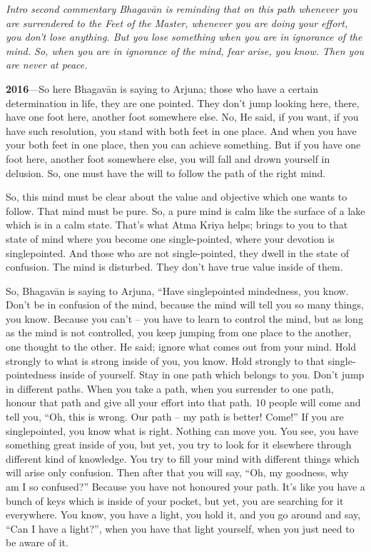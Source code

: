 \textit{Intro second commentary
Bhagavān is reminding that on this path whenever you are surrendered to the Feet of the Master, whenever you are doing your effort, you don’t lose anything. But you lose something when you are in ignorance of the mind. So, when you are in ignorance of the mind, fear arise, you know. Then you are never at peace.}

\textbf{2016}---So here Bhagavān is saying to Arjuna; those who have a certain determination in life, they are one pointed. They don’t jump looking here, there, have one foot here, another foot somewhere else. No, He said, if you want, if you have such resolution, you stand with both feet in one place. And when you have your both feet in one place, then you can achieve something. But if you have one foot here, another foot somewhere else, you will fall and drown yourself in delusion. So, one must have the will to follow the path of the right mind.

So, this mind must be clear about the value and objective which one wants to follow. That mind must be pure. So, a pure mind is calm like the surface of a lake which is in a calm state. That’s what Atma Kriya helps; brings to you to that state of mind where you become one single-pointed, where your devotion is singlepointed. And those who are not single-pointed, they dwell in the state of confusion. The mind is disturbed. They don’t have true value inside of them.

So, Bhagavān is saying to Arjuna, “Have singlepointed mindedness, you know. Don’t be in confusion of the mind, because the mind will tell you so many things, you know. Because you can’t – you have to learn to control the mind, but as long as the mind is not controlled, you keep jumping from one place to the another, one thought to the other. He said; ignore what comes out from your mind. Hold strongly to what is strong inside of you, you know. Hold strongly to that single-pointedness inside of yourself. Stay in one path which belongs to you. Don’t jump in different paths. When you take a path, when you surrender to one path, honour that path and give all your effort into that path. 10 people will come and tell you, “Oh, this is wrong. Our path – my path is better! Come!” If you are singlepointed, you know what is right. Nothing can move you. You see, you have something great inside of you, but yet, you try to look for it elsewhere through different kind of knowledge. You try to fill your mind with different things which will arise only confusion. Then after that you will say, “Oh, my goodness, why am I so confused?” Because you have not honoured your path. It’s like you have a bunch of keys which is inside of your pocket, but yet, you are searching for it everywhere. You know, you have a light, you hold it, and you go around and say, “Can I have a light?”, when you have that light yourself, when you just need to be aware of it.

